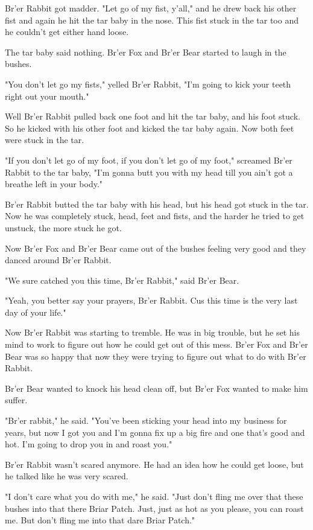 Br'er Rabbit got madder. "Let go of my fist, y'all," and he drew back his other fist and again he hit the tar baby in the nose. This fist stuck in the tar too and he couldn't get either hand loose.

The tar baby said nothing. Br'er Fox and Br'er Bear started to laugh in the bushes.

"You don't let go my fists," yelled Br'er Rabbit, "I'm going to kick your teeth right out your mouth."

Well Br'er Rabbit pulled back one foot and hit the tar baby, and his foot stuck. So he kicked with his other foot and kicked the tar baby again. Now both feet were stuck in the tar.

"If you don't let go of my foot, if you don't let go of my foot," screamed Br'er Rabbit to the tar baby, "I'm gonna butt you with my head till you ain't got a breathe left in your body."

Br'er Rabbit butted the tar baby with his head, but his head got stuck in the tar. Now he was completely stuck, head, feet and fists, and the harder he tried to get unstuck, the more stuck he got.

Now Br'er Fox and Br'er Bear came out of the bushes feeling very good and they danced around Br'er Rabbit.

"We sure catched you this time, Br'er Rabbit," said Br'er Bear.

"Yeah, you better say your prayers, Br'er Rabbit. Cus this time is the very last day of your life."

Now Br'er Rabbit was starting to tremble. He was in big trouble, but he set his mind to work to figure out how he could get out of this mess. Br'er Fox and Br'er Bear was so happy that now they were trying to figure out what to do with Br'er Rabbit.

Br'er Bear wanted to knock his head clean off, but Br'er Fox wanted to make him suffer.

"Br'er rabbit," he said. "You've been sticking your head into my business for years, but now I got you and I'm gonna fix up a big fire and one that's good and hot. I'm going to drop you in and roast you."

Br'er Rabbit wasn't scared anymore. He had an idea how he could get loose, but he talked like he was very scared.

"I don't care what you do with me," he said. "Just don't fling me over that these bushes into that there Briar Patch. Just, just as hot as you please, you can roast me. But don't fling me into that dare Briar Patch."

